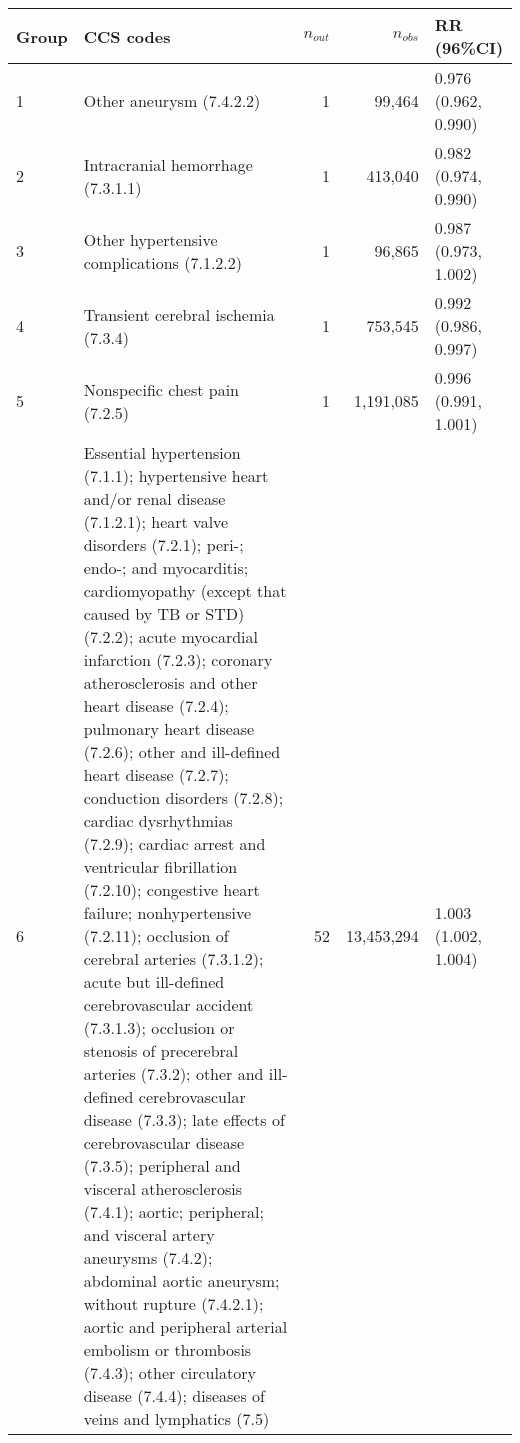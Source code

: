 \begin{tabular}{lp{6.5cm}rrp{2.2cm}}
  \hline
Group & CCS codes & $n_{out}$ & $n_{obs}$ & RR (96\%CI) \\ 
  \hline
   1 & Other aneurysm (7.4.2.2) &    1 & 99,464 & 0.976 (0.962, 0.990) \\ 
     2 & Intracranial hemorrhage (7.3.1.1) &    1 & 413,040 & 0.982 (0.974, 0.990) \\ 
     3 & Other hypertensive complications (7.1.2.2) &    1 & 96,865 & 0.987 (0.973, 1.002) \\ 
     4 & Transient cerebral ischemia (7.3.4) &    1 & 753,545 & 0.992 (0.986, 0.997) \\ 
     5 & Nonspecific chest pain (7.2.5) &    1 & 1,191,085 & 0.996 (0.991, 1.001) \\ 
     6 & Essential hypertension (7.1.1); hypertensive heart and/or renal disease (7.1.2.1); heart valve disorders (7.2.1); peri-; endo-; and myocarditis; cardiomyopathy (except that caused by TB or STD) (7.2.2); acute myocardial infarction (7.2.3); coronary atherosclerosis and other heart disease (7.2.4); pulmonary heart disease (7.2.6); other and ill-defined heart disease (7.2.7); conduction disorders (7.2.8); cardiac dysrhythmias (7.2.9); cardiac arrest and ventricular fibrillation (7.2.10); congestive heart failure; nonhypertensive (7.2.11); occlusion of cerebral arteries (7.3.1.2); acute but ill-defined cerebrovascular accident (7.3.1.3); occlusion or stenosis of precerebral arteries (7.3.2); other and ill-defined cerebrovascular disease (7.3.3); late effects of cerebrovascular disease (7.3.5); peripheral and visceral atherosclerosis (7.4.1); aortic; peripheral; and visceral artery aneurysms (7.4.2); abdominal aortic aneurysm; without rupture (7.4.2.1); aortic and peripheral arterial embolism or thrombosis (7.4.3); other circulatory disease (7.4.4); diseases of veins and lymphatics (7.5) &   52 & 13,453,294 & 1.003 (1.002, 1.004) \\ 
   \hline
\end{tabular}

